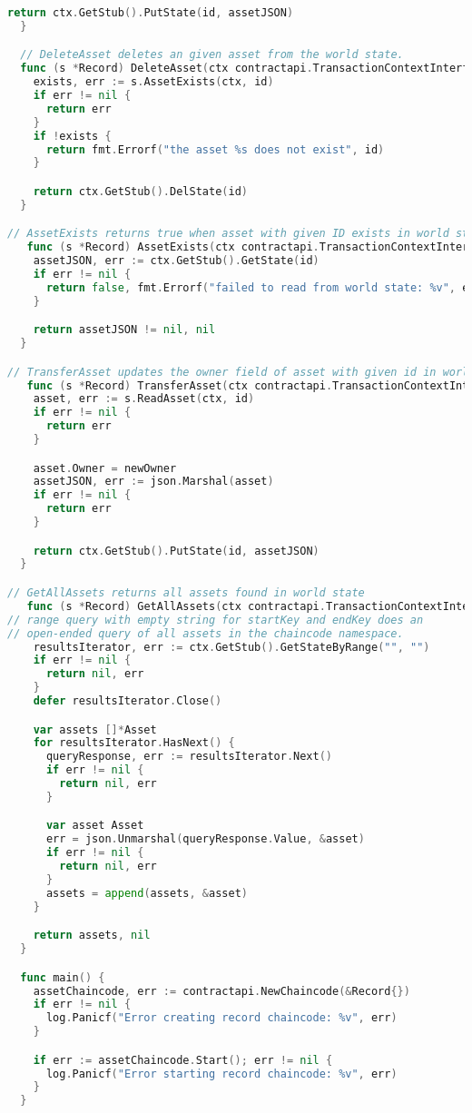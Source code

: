 \begin{lstlisting}[language=Go, caption={Chaincode representing immunisation records.}]
    return ctx.GetStub().PutState(id, assetJSON)
  }

  // DeleteAsset deletes an given asset from the world state.
  func (s *Record) DeleteAsset(ctx contractapi.TransactionContextInterface, id string) error {
    exists, err := s.AssetExists(ctx, id)
    if err != nil {
      return err
    }
    if !exists {
      return fmt.Errorf("the asset %s does not exist", id)
    }

    return ctx.GetStub().DelState(id)
  }

// AssetExists returns true when asset with given ID exists in world state
   func (s *Record) AssetExists(ctx contractapi.TransactionContextInterface, id string) (bool, error) {
    assetJSON, err := ctx.GetStub().GetState(id)
    if err != nil {
      return false, fmt.Errorf("failed to read from world state: %v", err)
    }

    return assetJSON != nil, nil
  }

// TransferAsset updates the owner field of asset with given id in world state.
   func (s *Record) TransferAsset(ctx contractapi.TransactionContextInterface, id string, newOwner string) error {
    asset, err := s.ReadAsset(ctx, id)
    if err != nil {
      return err
    }

    asset.Owner = newOwner
    assetJSON, err := json.Marshal(asset)
    if err != nil {
      return err
    }

    return ctx.GetStub().PutState(id, assetJSON)
  }

// GetAllAssets returns all assets found in world state
   func (s *Record) GetAllAssets(ctx contractapi.TransactionContextInterface) ([]*Asset, error) {
// range query with empty string for startKey and endKey does an
// open-ended query of all assets in the chaincode namespace.
    resultsIterator, err := ctx.GetStub().GetStateByRange("", "")
    if err != nil {
      return nil, err
    }
    defer resultsIterator.Close()

    var assets []*Asset
    for resultsIterator.HasNext() {
      queryResponse, err := resultsIterator.Next()
      if err != nil {
        return nil, err
      }

      var asset Asset
      err = json.Unmarshal(queryResponse.Value, &asset)
      if err != nil {
        return nil, err
      }
      assets = append(assets, &asset)
    }

    return assets, nil
  }

  func main() {
    assetChaincode, err := contractapi.NewChaincode(&Record{})
    if err != nil {
      log.Panicf("Error creating record chaincode: %v", err)
    }

    if err := assetChaincode.Start(); err != nil {
      log.Panicf("Error starting record chaincode: %v", err)
    }
  }
\end{lstlisting}
\label{appendix:chaincode}